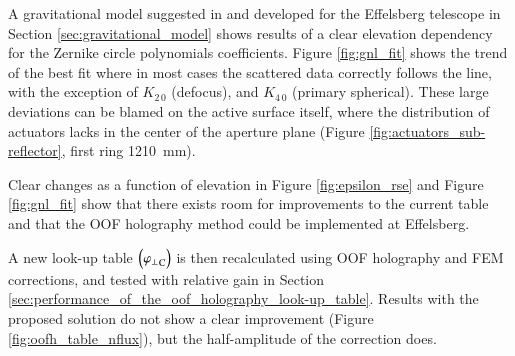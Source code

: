 \documentclass[
    ]
    {aa}
\begin{document}
    A gravitational model suggested in \citet{2007A&A...465..685N} and developed for the Effelsberg telescope in Section \ref{sec:gravitational_model} shows results of a clear elevation dependency for the Zernike circle polynomials coefficients. Figure \ref{fig:gnl_fit} shows the trend of the best fit where in most cases the scattered data correctly follows the line, with the exception of $K_{2\,0}$ (defocus), and $K_{4\,0}$ (primary spherical). These large deviations can be blamed on the active surface itself, where the distribution of actuators lacks in the center of the aperture plane (Figure \ref{fig:actuators_sub-reflector}, first ring \SI{1210}{\mm}). 

    Clear changes as a function of elevation in Figure \ref{fig:epsilon_rse} and Figure \ref{fig:gnl_fit} show that there exists room for improvements to the current table and that the OOF holography method could be implemented at Effelsberg.

    A new look-up table $\del{{\varphi_\bot}_\text{C}}$ is then recalculated using OOF holography and FEM corrections, and tested with relative gain in Section \ref{sec:performance_of_the_oof_holography_look-up_table}. Results with the proposed solution do not show a clear improvement (Figure \ref{fig:oofh_table_nflux}), but the half-amplitude of the correction does.

\end{document}
